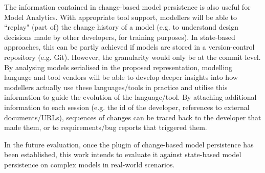 The information contained in change-based model persistence is also useful for Model Analytics. With appropriate tool support, modellers will be able to ``replay" (part of) the change history of a model (e.g. to understand design decisions made by other developers, for training purposes). In state-based approaches, this can be partly achieved if models are stored in a version-control repository (e.g. Git). However, the granularity would only be at the commit level. By analysing models serialised in the proposed representation, modelling language and tool vendors will be able to develop deeper insights into how modellers actually use these languages/tools in practice and utilise this information to guide the evolution of the language/tool. By attaching additional information to each session (e.g. the id of the developer, references to external documents/URLs), sequences of changes can be traced back to the developer that made them, or to requirements/bug reports that triggered them.

In the future evaluation, once the plugin of change-based model persistence has been established, this work intends to evaluate it against state-based model persistence on complex models in real-world scenarios.


